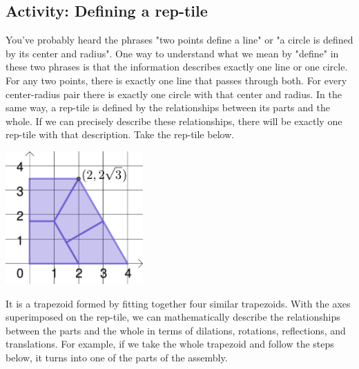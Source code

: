 \subsection{Activity: Defining a rep-tile}

You've probably heard the phrases "two points define a line" or "a circle is defined by its center and radius". One way to understand what we mean by "define" in these two phrases is that the information describes exactly one line or one circle. For any two points, there is exactly one line that passes through both. For every center-radius pair there is exactly one circle with that center and radius. In the same way, a rep-tile is defined by the relationships between its parts and the whole. If we can precisely describe these relationships, there will be exactly one rep-tile with that description. Take the rep-tile below.
\begin{center}
\includegraphics[height=2in]{images/rt-trap}
\end{center}
It is a trapezoid formed by fitting together four similar trapezoids. With the axes superimposed on the rep-tile, we can mathematically describe the relationships between the parts and the whole in terms of dilations, rotations, reflections, and translations. For example, if we take the whole trapezoid and follow the steps below, it turns into one of the parts of the assembly.
